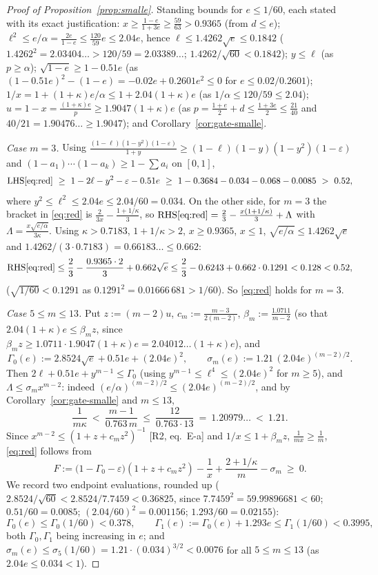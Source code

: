 \documentclass[11pt]{amsart}
\newcommand{\eps}{\varepsilon}
\begin{document}
\begin{proof}[Proof of Proposition~\ref{prop:smalle}]
Standing bounds for $e\le1/60$, each stated with its exact justification:
$x\ge\frac{1-e}{1+3e}\ge\frac{59}{63}>0.9365$ (from $d\le e$);
$\ell^2\le e/\alpha=\frac{2e}{1-e}\le\frac{120}{59}e\le2.04e$, hence
$\ell\le1.4262\sqrt e\le0.1842$
($1.4262^2=2.03404\ldots>120/59=2.03389\ldots$;
$1.4262/\sqrt{60}<0.1842$); $y\le\ell$ (as $p\ge\alpha$);
$\sqrt{1-e}\ge1-0.51e$ (as $(1-0.51e)^2-(1-e)=-0.02e+0.2601e^2\le0$ for
$e\le0.02/0.2601$); $1/x=1+(1+\kappa)e/\alpha\le1+2.04(1+\kappa)e$
(as $1/\alpha\le120/59\le2.04$);
$u=1-x=\frac{(1+\kappa)e}{p}\ge1.9047(1+\kappa)e$
(as $p=\frac{1+e}2+d\le\frac{1+3e}2\le\frac{21}{40}$ and
$40/21=1.90476\ldots\ge1.9047$); and Corollary~\ref{cor:gate-smalle}.

\emph{Case $m=3$.}  Using
$\frac{(1-\ell)(1-y^2)(1-\eps)}{1+y}\ge(1-\ell)(1-y)(1-y^2)(1-\eps)$ and
$(1-a_1)\cdots(1-a_k)\ge1-\sum a_i$ on $[0,1]$,
\[
 \mathrm{LHS}\eqref{eq:red}\ \ge\ 1-2\ell-y^2-\eps-0.51e
 \ \ge\ 1-0.3684-0.034-0.068-0.0085\ >\ 0.52,
\]
where $y^2\le\ell^2\le2.04e\le2.04/60=0.034$.  On the other side, for $m=3$
the bracket in \eqref{eq:red} is $\frac{2}{3x}-\frac{1+1/\kappa}3$, so
$\mathrm{RHS}\eqref{eq:red}=\frac23-\frac{x(1+1/\kappa)}3+\Lambda$ with
$\Lambda=\frac{x\sqrt{e/\alpha}}{3\kappa}$.  Using $\kappa>0.7183$,
$1+1/\kappa>2$, $x\ge0.9365$, $x\le1$, $\sqrt{e/\alpha}\le1.4262\sqrt e$
and $1.4262/(3\cdot0.7183)=0.66183\ldots\le0.662$:
\[
 \mathrm{RHS}\eqref{eq:red}\le\frac23-\frac{0.9365\cdot2}{3}+0.662\sqrt e
 \le\frac23-0.6243+0.662\cdot0.1291<0.128<0.52,
\]
($\sqrt{1/60}<0.1291$ as $0.1291^2=0.01666\,681>1/60$).  So \eqref{eq:red}
holds for $m=3$.

\emph{Case $5\le m\le13$.}  Put $z:=(m-2)u$, $c_m:=\frac{m-3}{2(m-2)}$,
$\beta_m:=\frac{1.0711}{m-2}$ (so that $2.04(1+\kappa)e\le\beta_m z$, since
$\beta_mz\ge1.0711\cdot1.9047(1+\kappa)e=2.04012\ldots(1+\kappa)e$), and
\[
 \Gamma_0(e):=2.8524\sqrt e+0.51e+(2.04e)^2,\qquad
 \sigma_m(e):=1.21\,(2.04e)^{(m-2)/2}.
\]
Then $2\ell+0.51e+y^{m-1}\le\Gamma_0$ (using
$y^{m-1}\le\ell^4\le(2.04e)^2$ for $m\ge5$), and
$\Lambda\le\sigma_mx^{m-2}$: indeed
$(e/\alpha)^{(m-2)/2}\le(2.04e)^{(m-2)/2}$, and by
Corollary~\ref{cor:gate-smalle} and $m\le13$,
\[
 \frac1{m\kappa}\ <\ \frac{m-1}{0.763\,m}\ \le\ \frac{12}{0.763\cdot13}
 \ =\ 1.20979\ldots\ <\ 1.21 .
\]
Since $x^{m-2}\le(1+z+c_mz^2)^{-1}$ [R2, eq.~E-a] and
$1/x\le1+\beta_mz$, $\frac1{mx}\ge\frac1m$, \eqref{eq:red} follows from
\begin{equation}\label{eq:F}
 F:=\bigl(1-\Gamma_0-\eps\bigr)(1+z+c_mz^2)-\frac1x+\frac{2+1/\kappa}m-\sigma_m\ \ge\ 0 .
\end{equation}
We record two endpoint evaluations, rounded up
($2.8524/\sqrt{60}<2.8524/7.7459<0.36825$, since $7.7459^2=59.99896681<60$;
$0.51/60=0.0085$; $(2.04/60)^2=0.001156$; $1.293/60=0.02155$):
\begin{equation}\label{eq:G-ends}
 \Gamma_0(e)\le\Gamma_0(1/60)<0.378,\qquad
 \Gamma_1(e):=\Gamma_0(e)+1.293e\le\Gamma_1(1/60)<0.3995,
\end{equation}
both $\Gamma_0,\Gamma_1$ being increasing in $e$; and
$\sigma_m(e)\le\sigma_5(1/60)=1.21\cdot(0.034)^{3/2}<0.0076$ for all
$5\le m\le13$ (as $2.04e\le0.034<1$).


\end{proof}
\end{document}
